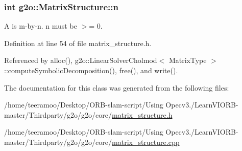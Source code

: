 \subsubsection[{\texorpdfstring{n}{n}}]{\setlength{\rightskip}{0pt plus 5cm}int g2o\+::\+Matrix\+Structure\+::n}\hypertarget{classg2o_1_1MatrixStructure_aa91f296406c17ab3a826d03bf75cfea7}{}\label{classg2o_1_1MatrixStructure_aa91f296406c17ab3a826d03bf75cfea7}


A is m-\/by-\/n. n must be $>$= 0. 



Definition at line 54 of file matrix\+\_\+structure.\+h.



Referenced by alloc(), g2o\+::\+Linear\+Solver\+Cholmod$<$ Matrix\+Type $>$\+::compute\+Symbolic\+Decomposition(), free(), and write().



The documentation for this class was generated from the following files\+:\begin{DoxyCompactItemize}
\item 
/home/teeramoo/\+Desktop/\+O\+R\+B-\/slam-\/script/\+Using Opecv3./\+Learn\+V\+I\+O\+R\+B-\/master/\+Thirdparty/g2o/g2o/core/\hyperlink{matrix__structure_8h}{matrix\+\_\+structure.\+h}\item 
/home/teeramoo/\+Desktop/\+O\+R\+B-\/slam-\/script/\+Using Opecv3./\+Learn\+V\+I\+O\+R\+B-\/master/\+Thirdparty/g2o/g2o/core/\hyperlink{matrix__structure_8cpp}{matrix\+\_\+structure.\+cpp}\end{DoxyCompactItemize}
